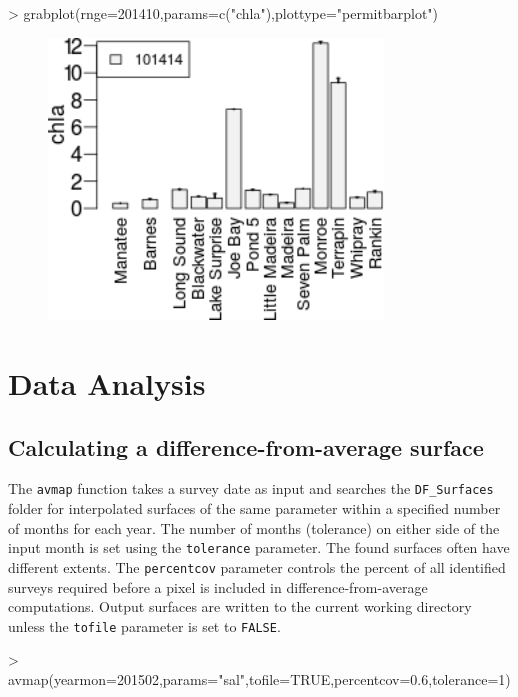\documentclass[12pt]{article}
\begin{document}
\begin{Schunk}
\begin{Sinput}
> grabplot(rnge=201410,params=c("chla"),plottype="permitbarplot")
\end{Sinput}
\end{Schunk}

 \begin{figure}[h!]
 \begin{center}
 \includegraphics[width=3.5in,keepaspectratio=true]{figure1}
 \end{center}
 \label{fig:one}
 \end{figure}

\section{Data Analysis}
\subsection{Calculating a difference-from-average surface}
The \texttt{avmap} function takes a survey date as input and searches the \verb|DF_Surfaces| folder for interpolated surfaces of the same parameter within a specified number of months for each year. The number of months (tolerance) on either side of the input month is set using the \texttt{tolerance} parameter. The found surfaces often have different extents. The \texttt{percentcov} parameter controls the percent of all identified surveys required before a pixel is included in difference-from-average computations. Output surfaces are written to the current working directory unless the \texttt{tofile} parameter is set to \texttt{FALSE}.

\begin{Schunk}
\begin{Sinput}
> avmap(yearmon=201502,params="sal",tofile=TRUE,percentcov=0.6,tolerance=1)
\end{Sinput}
\end{Schunk}
\end{document}
